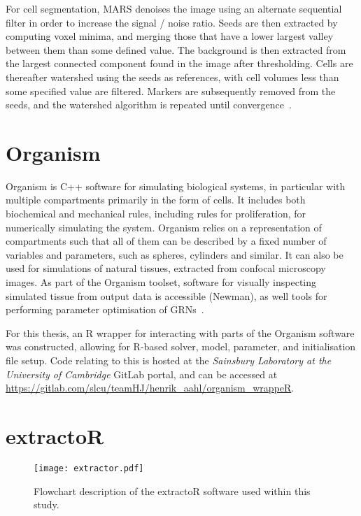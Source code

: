 For cell segmentation, MARS denoises the image using an alternate sequential filter in
order to increase the signal / noise ratio. Seeds are then extracted by
computing voxel minima, and merging those that have a lower largest valley
between them than some defined value. The background is then extracted from the
largest connected component found in the image after thresholding. Cells are
thereafter watershed using the seeds as references, with cell volumes less than
some specified value are filtered. Markers are subsequently removed from the
seeds, and the watershed algorithm is repeated until
convergence~\cite{fernandez2010imaging}.

\section{Organism}
Organism is C++ software for simulating biological systems, in particular with
multiple compartments primarily in the form of cells. It includes both
biochemical and mechanical rules, including rules for proliferation, for
numerically simulating the system. Organism relies on a representation of
compartments such that all of them can be described by a fixed number of
variables and parameters, such as spheres, cylinders and similar. It can also be
used for simulations of natural tissues, extracted from confocal microscopy
images. As part of the Organism toolset, software for visually inspecting
simulated tissue from output data is accessible (Newman), as well tools for
performing parameter optimisation of
GRNs~\cite{jonsson2005explicit,gruel2016epidermis}.

For this thesis, an R wrapper for interacting with parts of the Organism software was
constructed, allowing for R-based solver, model, parameter, and initialisation file setup.
Code relating to this is hosted at the \textit{Sainsbury Laboratory at the University of
  Cambridge} GitLab portal, and can be accessed at 
\url{https://gitlab.com/slcu/teamHJ/henrik_aahl/organism_wrappeR}.

\section{extractoR}
\begin{figure}[H]
  \centering
  \texttt{[image: extractor.pdf]}
  \caption[extractoR flowchart]{Flowchart description of the extractoR software used within this
    study.}
  \label{fig:extractor}
\end{figure}

